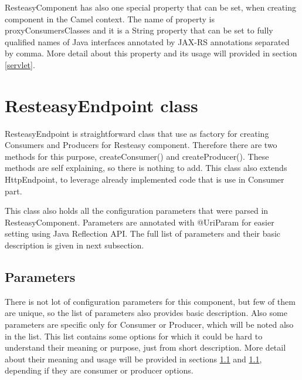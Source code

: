 \documentclass[12pt,final,oneside]{fithesis2}
\begin{document}
ResteasyComponent has also one special property that can be set, when creating component in the Camel context. The name of property is proxyConsumersClasses and it is a String property that can be set to fully qualified names of Java interfaces annotated by JAX-RS annotations separated by comma. More detail about this property and its usage will provided in section \ref{servlet}.

\section{ResteasyEndpoint class}
ResteasyEndpoint is straightforward class that use as factory for creating Consumers and Producers for Resteasy component. Therefore there are two methods for this purpose, createConsumer() and createProducer(). These methods are self explaining, so there is nothing to add. This class also extends HttpEndpoint, to leverage already implemented code that is use in Consumer part.

This class also holds all the configuration parameters that were parsed in ResteasyComponent. Parameters are annotated with @UriParam for easier setting using Java Reflection API. The full list of parameters and their basic description is given in next subsection.

\subsection{Parameters}
There is not lot of configuration parameters for this component, but few of them are unique, so the list of parameters also provides basic description. Also some parameters are specific only for Consumer or Producer, which will be noted also in the list. This list contains some options for which it could be hard to understand their meaning or purpose, just from short description. More detail about their meaning and usage will be provided in sections \ref{} and \ref{}, depending if they are consumer or producer options.  
\end{document}

